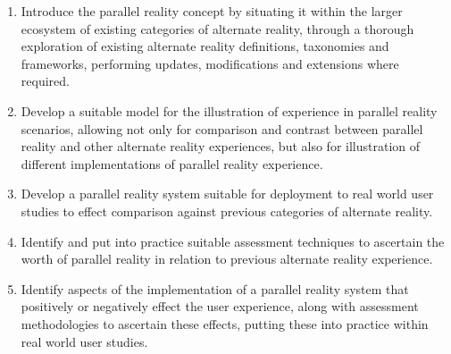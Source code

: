 \begin{enumerate}
	\item Introduce the parallel reality concept by situating it within the larger ecosystem of existing categories of alternate reality, through a thorough exploration of existing alternate reality definitions, taxonomies and frameworks, performing updates, modifications and extensions where required.
	
	\item Develop a suitable model for the illustration of experience in parallel reality scenarios, allowing not only for comparison and contrast between parallel reality and other alternate reality experiences, but also for illustration of different implementations of parallel reality experience.
	
	\item Develop a parallel reality system suitable for deployment to real world user studies to effect comparison against previous categories of alternate reality.
	
	\item Identify and put into practice suitable assessment techniques to ascertain the worth of parallel reality in relation to previous alternate reality experience.
	
	\item Identify aspects of the implementation of a parallel reality system that positively or negatively effect the user experience, along with assessment methodologies to ascertain these effects, putting these into practice within real world user studies.
	
\end{enumerate}


